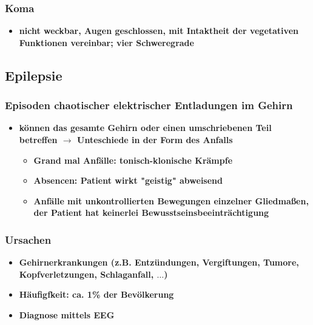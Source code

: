 		\subsubsection*{Koma}
			\begin{itemize}
				\item \textbf{nicht weckbar, Augen geschlossen, mit Intaktheit der vegetativen Funktionen vereinbar; vier Schweregrade}
			\end{itemize}
	\subsection*{Epilepsie}
		\subsubsection*{Episoden chaotischer elektrischer Entladungen im Gehirn}
			\begin{itemize}
				\item \textbf{können das gesamte Gehirn oder einen umschriebenen Teil betreffen $\rightarrow$ Unteschiede in der Form des Anfalls}
					\begin{itemize}
						\item \textbf{Grand mal Anfälle: tonisch-klonische Krämpfe}
						\item \textbf{Absencen: Patient wirkt "geistig" abweisend}
						\item \textbf{Anfälle mit unkontrollierten Bewegungen einzelner Gliedmaßen, der Patient hat keinerlei Bewusstseinsbeeinträchtigung}
					\end{itemize}
			\end{itemize}
		\subsubsection*{Ursachen}
			\begin{itemize}
				\item \textbf{Gehirnerkrankungen (z.B. Entzündungen, Vergiftungen, Tumore, Kopfverletzungen, Schlaganfall, $\dots$)}
				\item \textbf{Häufigfkeit: ca. 1\% der Bevölkerung}
				\item \textbf{Diagnose mittels EEG}
			\end{itemize}